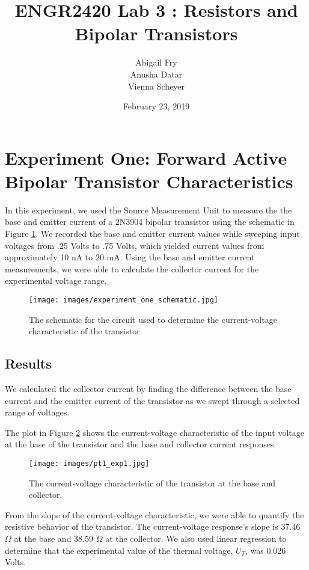\documentclass{article}
\title{ENGR2420 Lab 3 : Resistors and Bipolar Transistors}
\author{Abigail Fry \\ Anusha Datar \\ Vienna Scheyer}
\date{February 23, 2019}
\begin{document}
\maketitle

\section{Experiment One: Forward Active Bipolar Transistor Characteristics}
In this experiment, we used the Source Measurement Unit to measure the the base and emitter current  of a 2N3904 bipolar transistor using the schematic in Figure \ref{fig:exp1_sch}.  We recorded the base and emitter current values while sweeping input voltages from .25 Volts to .75 Volts, which yielded current values from approximately 10 nA to 20 mA.  Using the base and emitter current measurements, we were able to calculate the collector current for the experimental voltage range.
\begin{figure}[H]   
  \centering        
  \texttt{[image: images/experiment\_one\_schematic.jpg]}
  \caption{The schematic for the circuit used to determine the current-voltage characteristic of the transistor.}   
  \label{fig:exp1_sch}
\end{figure}

\subsection{Results}
We calculated the collector current by finding the difference between the base current and the emitter current of the transistor as we swept through a selected range of voltages. 

The plot in Figure \ref{fig:exp1_vc} shows the current-voltage characteristic of the input voltage at the base of the transistor and the base and collector current responses. 
\begin{figure}[H]   
  \centering        
  \texttt{[image: images/pt1\_exp1.jpg]}
  \caption{The current-voltage characteristic of the transistor at the base and collector.}   
  \label{fig:exp1_vc}
\end{figure}

From the slope of the current-voltage characteristic, we were able to  quantify the resistive behavior of the transistor. The current-voltage response's slope is 37.46 $\Omega$ at the base and 38.59 $\Omega$ at the collector. We also used linear regression to determine that the experimental value of the thermal voltage, $U_T$, was 0.026 Volts.
\end{document}
